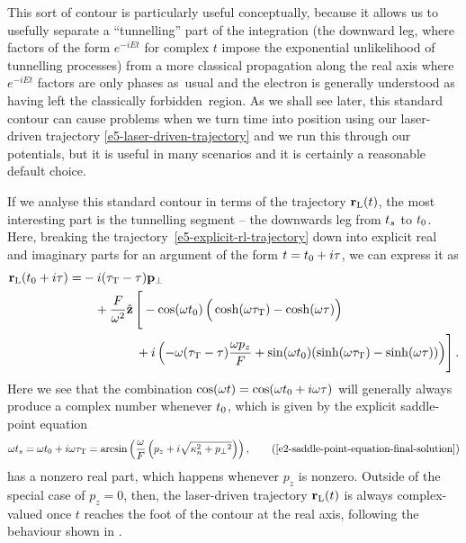 This sort of contour is particularly useful conceptually, because it allows us to usefully separate a ``tunnelling'' part of the integration (the downward leg, where factors of the form $e^{-iEt}$ for complex $t$ impose the exponential unlikelihood of tunnelling processes) from a more classical propagation along the real axis where $e^{-iEt}$ factors are only phases as~usual and the electron is generally understood as having left the classically forbidden~region. As we shall see later, this standard contour can cause problems when we turn time into position using our laser-driven trajectory \eqref{e5-laser-driven-trajectory} and we run this through our potentials, but it is useful in many scenarios and it is certainly a reasonable default choice.


If we analyse this standard contour in terms of the trajectory $\vb{r}_\mathrm{L}(t)$, the most interesting part is the tunnelling segment -- the downwards leg from ${t_s}$ to ${t_0}$. Here, breaking the trajectory~\eqref{e5-explicit-rl-trajectory} down into explicit real and imaginary parts for an argument of the form $t={t_0}+i\tau$, we can express it as
\begin{align}
\vb{r}_\mathrm{L}({t_0}+i\tau)
= &
- i({\tau_\mathrm{T}}-\tau){\vb{p}_{\perp}}
\nonumber \\ & \quad
+\frac{F}{\omega^2}\hat{\vb{z}} \left[\vphantom{\sum^n}
-\cos(\omega{t_0})
\left( \vphantom{\sum}
\cosh(\omega{\tau_\mathrm{T}})
-\cosh(\omega\tau)
\right)
\right. \nonumber \\ & \left. \vphantom{\sum^n} \qquad \qquad 
+i\left( 
-\omega({\tau_\mathrm{T}}-\tau)\frac{\omega p_z}{F}
+
\sin(\omega{t_0})(
\sinh(\omega{\tau_\mathrm{T}})
-\sinh(\omega\tau)
)
\right)
\right]
.
\label{e5-explicit-rl-trajectory-re-im-parts}
\end{align}
%
Here we see that the combination $\cos(\omega t) = \cos(\omega {t_0} + i \omega\tau)$ will generally always produce a complex number whenever ${t_0}$, which is given by the explicit saddle-point equation
\begin{equation}
\omega \ts
=\omega\tn+i\omega\tauT
= \arcsin\left(
\frac{\omega}{F}\left(p_z + i \sqrt{\kappa_n^2+\pt^2}\right)
\right)
,
\backtag{e2-saddle-point-equation-final-solution}
\end{equation}
has a nonzero real part, which happens whenever $p_z$ is nonzero. Outside of the special case of $p_z=0$, then, the laser-driven trajectory $\vb{r}_\mathrm{L}(t)$ is always complex-valued once $t$ reaches the foot of the contour at the real axis, following the behaviour shown in .


